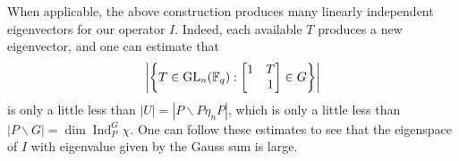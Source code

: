 \begin{remark} \label{rem:generic-eigenvalue}
    When applicable, the above construction produces many linearly independent eigenvectors for our operator $I$. Indeed, each available $T$ produces a new eigenvector, and one can estimate that
    \[\left|\left\{T\in\operatorname{GL}_n(\mathbb F_q):\begin{bmatrix}
        1 & T \\ & 1
    \end{bmatrix}\in G\right\}\right|\]
    is only a little less than $\left|U\right|=\left|P\backslash P\eta_nP\right|$, which is only a little less than
    $\left|P\backslash G\right|=\dim\operatorname{Ind}_P^G\chi$. One can follow these estimates to see that the eigenspace of $I$ with eigenvalue given by the Gauss sum is large.
\end{remark}